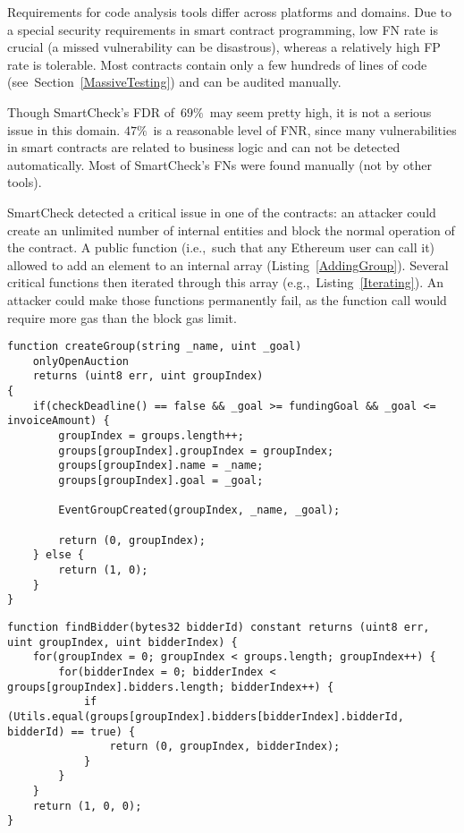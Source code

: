 Requirements for code analysis tools differ across platforms and domains.
Due to a special security requirements in smart contract programming, low FN rate is crucial (a missed vulnerability can be disastrous), whereas a relatively high FP rate is tolerable.
Most contracts contain only a few hundreds of lines of code (see~Section~\ref{MassiveTesting}) and can be audited manually.

Though SmartCheck's FDR of~$69\%$~may seem pretty high, it is not a serious issue in this domain.
$47\%$~is a reasonable level of FNR, since many vulnerabilities in smart contracts are related to business logic and can not be detected automatically.
Most of SmartCheck's FNs were found manually (not by other tools).

SmartCheck detected a critical issue in one of the contracts: an attacker could create an unlimited number of internal entities and block the normal operation of the contract.
A public function (i.e.,~such that any Ethereum user can call it) allowed to add an element to an internal array (Listing~\ref{AddingGroup}).
Several critical functions then iterated through this array (e.g.,~Listing~\ref{Iterating}).
An attacker could make those functions permanently fail, as the function call would require more gas than the block gas limit.

\begin{minipage}{\linewidth} 
\begin{lstlisting}[caption={Adding an element to an internal array.},label={AddingGroup},language=Solidity]
function createGroup(string _name, uint _goal)
    onlyOpenAuction
    returns (uint8 err, uint groupIndex)
{
	if(checkDeadline() == false && _goal >= fundingGoal && _goal <= invoiceAmount) {
		groupIndex = groups.length++;
		groups[groupIndex].groupIndex = groupIndex;
		groups[groupIndex].name = _name;
		groups[groupIndex].goal = _goal;

		EventGroupCreated(groupIndex, _name, _goal);

		return (0, groupIndex);
	} else {
		return (1, 0);
	}
}
\end{lstlisting}
\end{minipage}

\begin{minipage}{\linewidth}
\begin{lstlisting}[caption={Iterating through an internal array.},label={Iterating},language=Solidity]
function findBidder(bytes32 bidderId) constant returns (uint8 err, uint groupIndex, uint bidderIndex) {
	for(groupIndex = 0; groupIndex < groups.length; groupIndex++) {
		for(bidderIndex = 0; bidderIndex < groups[groupIndex].bidders.length; bidderIndex++) {
			if (Utils.equal(groups[groupIndex].bidders[bidderIndex].bidderId, bidderId) == true) {
				return (0, groupIndex, bidderIndex);
			}
		}
	}
	return (1, 0, 0);
}
\end{lstlisting}
\end{minipage}


